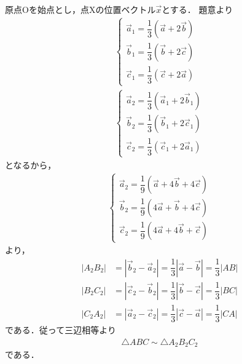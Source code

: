 \documentclass[../../main.tex]{subfiles}
\begin{document}
原点Oを始点とし，点Xの位置ベクトル$\vec{x}$とする．
題意より
\begin{align}
  \begin{cases}
    \vec{a}_1 = \dfrac{1}{3}(\vec{a}+2\vec{b}) \\
    \vec{b}_1 = \dfrac{1}{3}(\vec{b}+2\vec{c}) \\
    \vec{c}_1 = \dfrac{1}{3}(\vec{c}+2\vec{a})
  \end{cases} \\
  \begin{cases}
    \vec{a}_2 = \dfrac{1}{3}(\vec{a}_1+2\vec{b}_1) \\
    \vec{b}_2 = \dfrac{1}{3}(\vec{b}_1+2\vec{c}_1) \\
    \vec{c}_2 = \dfrac{1}{3}(\vec{c}_1+2\vec{a}_1)
  \end{cases}
\end{align}
となるから，
\begin{align}
  \begin{cases}
    \vec{a}_2 = \dfrac{1}{9}(\vec{a}+4\vec{b}+4\vec{c}) \\
    \vec{b}_2 = \dfrac{1}{9}(4\vec{a}+\vec{b}+4\vec{c}) \\
    \vec{c}_2 = \dfrac{1}{9}(4\vec{a}+4\vec{b}+\vec{c})
  \end{cases}
\end{align}
より，
\begin{align}
  |A_2B_2| &= |\vec{b}_2-\vec{a}_2| = \dfrac{1}{3}|\vec{a}-\vec{b}| = \dfrac{1}{3}|AB| \\
  |B_2C_2| &= |\vec{c}_2-\vec{b}_2| = \dfrac{1}{3}|\vec{b}-\vec{c}| = \dfrac{1}{3}|BC| \\
  |C_2A_2| &= |\vec{a}_2-\vec{c}_2| = \dfrac{1}{3}|\vec{c}-\vec{a}| = \dfrac{1}{3}|CA|
\end{align}
である．従って三辺相等より
\begin{align}
  \triangle ABC \sim \triangle A_2B_2C_2
\end{align}
である．
\end{document}
